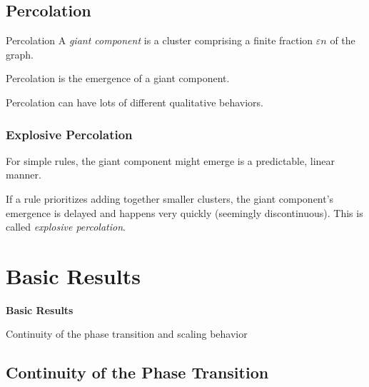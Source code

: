 \documentclass{beamer}
\begin{document}
\subsection{Percolation}

\begin{frame}{Percolation}
	A \textit{giant component} is a cluster comprising a finite fraction $\varepsilon n$ of the graph.
	\vspace{5mm}

	Percolation is the emergence of a giant component.
	\vspace{5mm}

	Percolation can have lots of different qualitative behaviors.
\end{frame}

\begin{frame}
	\frametitle{Explosive Percolation}

	For simple rules, the giant component might emerge is a predictable, linear manner.
	\vspace{5mm}

	If a rule prioritizes adding together smaller clusters, the giant component's emergence is delayed and happens very quickly (seemingly discontinuous). This is called \textit{explosive percolation}.
\end{frame}

\section{Basic Results}

{
\begin{frame}
        \bfseries
        {\color{white}
                \huge Basic Results
        }
        \vspace{5mm}

        {\color{myblue}
                Continuity of the phase transition and scaling behavior
        }
\end{frame}
}

\subsection{Continuity of the Phase Transition}
\end{document}

